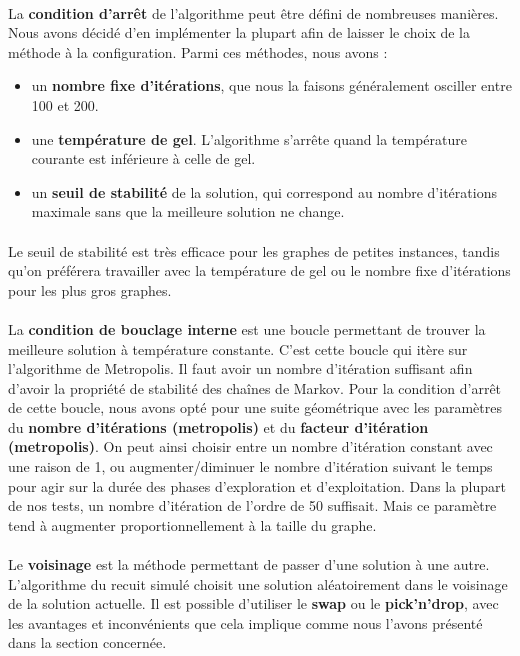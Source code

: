 \documentclass[12pt]{article}
\begin{document}
\paragraph{}La \textbf{condition d'arrêt} de l'algorithme peut être défini de nombreuses manières. Nous avons décidé d'en implémenter la plupart afin de laisser le choix de la méthode à la configuration. Parmi ces méthodes, nous avons :
\begin{itemize}
\item un \textbf{nombre fixe d'itérations}, que nous la faisons généralement osciller entre 100 et 200.
\item une \textbf{température de gel}. L'algorithme s'arrête quand la température courante est inférieure à celle de gel.
\item un \textbf{seuil de stabilité} de la solution, qui correspond au nombre d'itérations maximale sans que la meilleure solution ne change.
\end{itemize}

\paragraph{}Le seuil de stabilité est très efficace pour les graphes de petites instances, tandis qu'on préférera travailler avec la température de gel ou le nombre fixe d'itérations pour les plus gros graphes.

\paragraph{}La \textbf{condition de bouclage interne} est une boucle permettant de trouver la meilleure solution à température constante. C'est cette boucle qui itère sur l'algorithme de Metropolis. Il faut avoir un nombre d'itération suffisant afin d'avoir la propriété de stabilité des chaînes de Markov. Pour la condition d'arrêt de cette boucle, nous avons opté pour une suite géométrique avec les paramètres du \textbf{nombre d'itérations (metropolis)} et du \textbf{facteur d'itération (metropolis)}. On peut ainsi choisir entre un nombre  d'itération constant avec une raison de 1, ou augmenter/diminuer le nombre d'itération suivant le temps pour agir sur la durée des phases d'exploration et d'exploitation. Dans la plupart de nos tests, un nombre d'itération de l'ordre de 50 suffisait. Mais ce paramètre tend à augmenter proportionnellement à la taille du graphe.

\paragraph{}Le \textbf{voisinage} est la méthode permettant de passer d'une solution à une autre. L'algorithme du recuit simulé choisit une solution aléatoirement dans le voisinage de la solution actuelle. Il est possible d'utiliser le \textbf{swap} ou le \textbf{pick'n'drop}, avec les avantages et inconvénients que cela implique comme nous l'avons présenté dans la section concernée.
\end{document}
